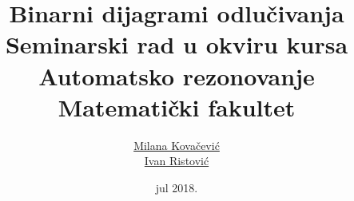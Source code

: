 \documentclass[a4paper]{article}
\theoremstyle{plain}
\theoremstyle{definition}
\begin{document}
\title{Binarni dijagrami odlu\v{c}ivanja\\ \small{Seminarski rad u okviru kursa\\Automatsko rezonovanje\\ Matematički fakultet}}

\author{\href{mailto:mi14031@matf.bg.ac.rs}{Milana Kova\v{c}evi\'c}\\\href{mailto:mi14042@matf.bg.ac.rs}{Ivan Ristovi\'c}}
\date{jul 2018.}

\maketitle



\tableofcontents

\newpage











\newpage

%
\end{document}
